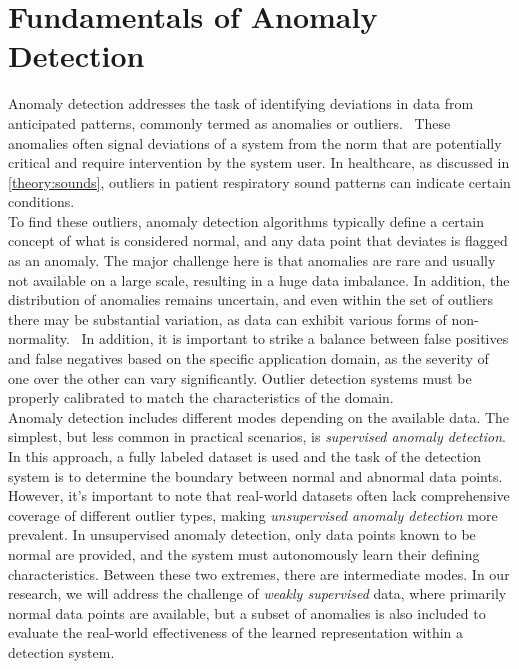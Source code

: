 \section{Fundamentals of Anomaly Detection}
Anomaly detection addresses the task of identifying deviations in data from anticipated patterns, commonly termed as anomalies or outliers.~\cite{chandola2009anomaly} These anomalies often signal deviations of a system from the norm that are potentially critical and require intervention by the system user. In healthcare, as discussed in \autoref{theory:sounds}, outliers in patient respiratory sound patterns can indicate certain conditions. \\
To find these outliers, anomaly detection algorithms typically define a certain concept of what is considered normal, and any data point that deviates is flagged as an anomaly. The major challenge here is that anomalies are rare and usually not available on a large scale, resulting in a huge data imbalance. In addition, the distribution of anomalies remains uncertain, and even within the set of outliers there may be substantial variation, as data can exhibit various forms of non-normality.~\cite{pang2021deep} In addition, it is important to strike a balance between false positives and false negatives based on the specific application domain, as the severity of one over the other can vary significantly. Outlier detection systems must be properly calibrated to match the characteristics of the domain.\\
Anomaly detection includes different modes depending on the available data. The simplest, but less common in practical scenarios, is \textit{supervised anomaly detection}. In this approach, a fully labeled dataset is used and the task of the detection system is to determine the boundary between normal and abnormal data points. However, it's important to note that real-world datasets often lack comprehensive coverage of different outlier types, making \textit{unsupervised anomaly detection} more prevalent. In unsupervised anomaly detection, only data points known to be normal are provided, and the system must autonomously learn their defining characteristics. Between these two extremes, there are intermediate modes. In our research, we will address the challenge of \textit{weakly supervised} data, where primarily normal data points are available, but a subset of anomalies is also included to evaluate the real-world effectiveness of the learned representation within a detection system. \\
